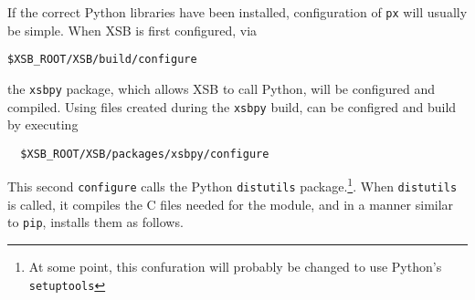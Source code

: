 If the correct Python libraries have been installed, configuration of
{\tt px} will usually be simple.  When XSB is first configured, via
\begin{verbatim}
$XSB_ROOT/XSB/build/configure
\end{verbatim}
the {\tt xsbpy} package, which allows XSB to call Python, will be
configured and compiled.  Using files created during the {\tt xsbpy}
build, \px{} can be configred and build by executing
\begin{verbatim}
  $XSB_ROOT/XSB/packages/xsbpy/configure
\end{verbatim}
This second {\tt configure} calls the Python {\tt distutils}
package.\footnote{At some point, this confuration will probably be
  changed to use Python's {\tt setuptools}}.  When {\tt distutils} is
called, it compiles the C files needed for the \px{} module, and in a
manner similar to {\tt pip}, installs them as follows.

